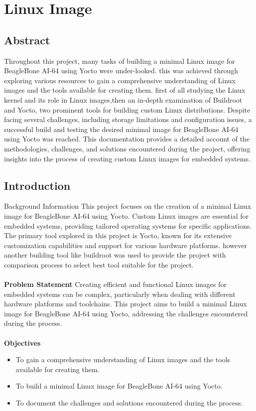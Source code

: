 \newpage
\section{Linux Image}



\subsection{Abstract}
Throughout this project, many tasks of building a minimal Linux image for BeagleBone AI-64 using Yocto were under-looked. this was achieved through exploring various resources to gain a comprehensive understanding of Linux images and the tools available for creating them. first of all studying the Linux kernel and its role in Linux images,then an in-depth examination of Buildroot and Yocto, two prominent tools for building custom Linux distributions. Despite facing several challenges, including storage limitations and configuration issues, a successful build and testing the desired minimal image for BeagleBone AI-64 using Yocto was reached. This documentation provides a detailed account of the methodologies, challenges, and solutions encountered during the project, offering insights into the process of creating custom Linux images for embedded systems.
\subsection{Introduction}

Background Information
This project focuses on the creation of a minimal Linux image for BeagleBone AI-64 using Yocto. Custom Linux images are essential for embedded systems, providing tailored operating systems for specific applications. The primary tool explored in this project is Yocto, known for its extensive customization capabilities and support for various hardware platforms. however another building tool like buildroot was used to provide the project with comparison process to select best tool suitable for the project.
\\ \\
\textbf{Problem Statement}
Creating efficient and functional Linux images for embedded systems can be complex, particularly when dealing with different hardware platforms and toolchains. This project aims to build a minimal Linux image for BeagleBone AI-64 using Yocto, addressing the challenges encountered during the process.
\\ \\
\textbf{Objectives}\\
\begin{itemize}
    \item To gain a comprehensive understanding of Linux images and the tools available for creating them.
    \item To build a minimal Linux image for BeagleBone AI-64 using Yocto.
    \item To document the challenges and solutions encountered during the process.

\end{itemize}

